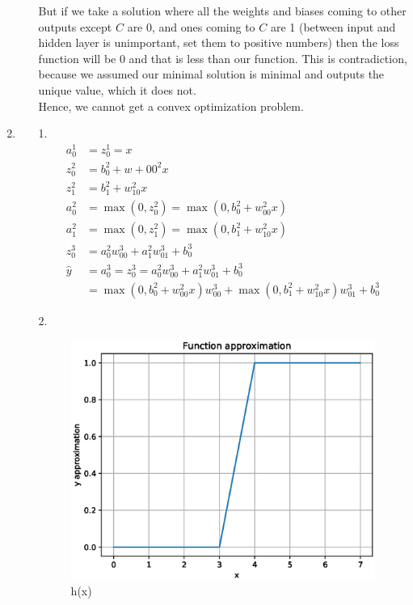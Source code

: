 \documentclass[10pt,a4paper]{article}
\begin{document}
\begin{enumerate}
\begin{enumerate}
But if we take a solution where all the  weights and biases coming to other outputs except $C$ are 0, and ones coming to $C$ are 1 (between input and hidden layer is unimportant, set them to positive numbers) then the loss function will be 0 and that is less than our function. This is contradiction, because we assumed our minimal solution is minimal and outputs the unique value, which it does not. 
\\Hence, we cannot get a convex optimization problem.
\end{enumerate}
\item
\begin{enumerate}
\item[1.]
\begin{align*}
a_0^1&= z_0^1=x \\
z_0^2&=b_0^2+w+{00}^2x\\
z_1^2&=b_1^2+w_{10}^2x\\
a_0^2&=\max(0, z_0^2)=\max(0,b_0^2+w_{00}^2x)\\
a_1^2&=\max(0, z_1^2)=\max(0, b_1^2+w_{10}^2x)\\
z_0^3&=a_0^2w_{00}^3+a_1^2w_{01}^3+b_0^3\\
\hat{y}&=a_0^3=z_0^3= a_0^2w_{00}^3+a_1^2w_{01}^3+b_0^3\\
&= \max(0, b_0^2+w_{00}^2x)w_{00}^3+\max(0,b_1^2+w_{10}^2x)w_{01}^3+b_0^3			
\end{align*}
\item[2.]
\begin{figure}
\includegraphics[scale=1]{graph.eps}
\caption{h(x)}
\end{figure}

\end{enumerate}
\end{enumerate}
\end{document}
